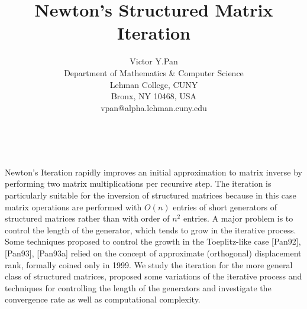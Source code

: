 \documentclass[11pt]{article}
\date{ ~ \hspace{-4mm}}
\title{Newton's Structured Matrix Iteration  }
\author{Victor Y.Pan \\ Department of Mathematics \& Computer Science \\ Lehman College, CUNY \\ Bronx, NY 10468, USA \\ vpan@alpha.lehman.cuny.edu}
\begin{document}
\maketitle
\thispagestyle{empty}


 



Newton's Iteration rapidly improves an initial approximation
to matrix inverse by performing two matrix multiplications per
recursive step. The iteration is particularly suitable for the
inversion of structured matrices because in this case matrix
operations are performed with $O(n)$ entries of short generators
of structured matrices rather than with order of $n^2$ entries. A
major problem is to control the length of the generator, which
tends to grow in the iterative process. Some techniques proposed
to control the growth in the Toeplitz-like case [Pan92], [Pan93],
[Pan93a] relied on the concept of approximate (orthogonal)
displacement rank, formally coined only in 1999. We study the
iteration for the more general class of structured matrices,
proposed some variations of the iterative process and techniques
for controlling the length of the generators and investigate the
convergence rate as well as computational complexity.
\end{document}
